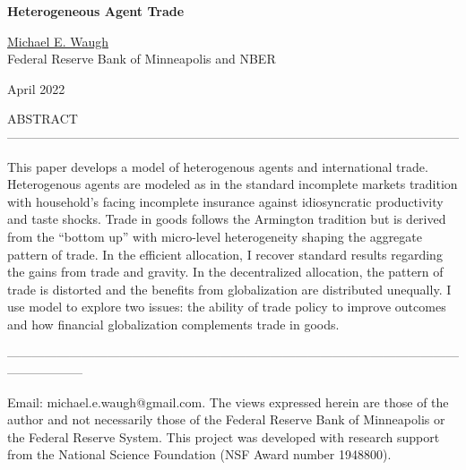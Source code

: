 \documentclass[12pt,pdftex]{article}
\begin{document}
\begin{onehalfspacing}

{\large \textbf{Heterogeneous Agent Trade}}

\vspace{1cm}

%

\href{http://www.waugheconomics.com/}{Michael E. Waugh} \\ Federal Reserve Bank of Minneapolis and NBER

\vspace{0.5cm}

April 2022

\vspace{1.5cm}


\normalsize

ABSTRACT ------------------------------------------------------------------------------------------------------------

This paper develops a model of heterogenous agents and international trade. Heterogenous agents are modeled as in the standard incomplete markets tradition with household's facing incomplete insurance against idiosyncratic productivity and taste shocks. Trade in goods follows the Armington tradition but is derived from the ``bottom up'' with micro-level heterogeneity shaping the aggregate pattern of trade. In the efficient allocation, I recover standard results regarding the gains from trade and gravity. In the decentralized allocation, the pattern of trade is distorted and the benefits from globalization are distributed unequally. I use model to explore two issues: the ability of trade policy to improve outcomes and how financial globalization complements trade in goods.

------------------------------------------------------------------------------------------------------------------------------
%

\vspace{6.5cm}

\footnotesize Email: michael.e.waugh@gmail.com. The views expressed herein are those of the author and not necessarily those of the Federal
Reserve Bank of Minneapolis or the Federal Reserve System. This project was developed with research support from the National Science Foundation (NSF Award number 1948800).


\end{onehalfspacing}
\end{document}
